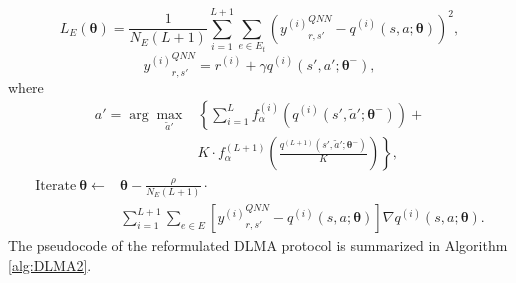 \documentclass[journal,comsoc]{IEEEtran}
\begin{document}
	\begin{equation}\label{loss3}
	{L_E}\left( {{\bm{\theta }}} \right) = \frac{1}{{{N_E}\left( {L + 1} \right)}}\sum\limits_{i = 1}^{L + 1} {\sum\limits_{e \in {E_t}} {{{\left( {{y^{\left( i \right)}}_{r,s'}^{QNN} - {q^{\left( i \right)}}\left( {s,a;{\bm{\theta }}} \right)} \right)}^2}} },
	\end{equation}
	\begin{equation}\label{yQNN3}
	{y^{\left( i \right)}}_{r,s'}^{QNN} = {r^{\left( i \right)}} + \gamma {q^{\left( i \right)}}\left( {s',a';{\bm{\theta^- }}} \right),
	\end{equation}
	where
	\begin{align}\label{greedy_action3}
	a' = \arg {\max _{\tilde a'}} &\left\{ \sum \limits_{i = 1}^L {f_\alpha ^{\left( i \right)}\left( {{q^{\left( i \right)}}\left( {s',\tilde a';{{\bm{\theta^- }}}} \right)} \right)}  + \right. \nonumber \\
	& \left. K \cdot f_\alpha ^{\left( {L + 1} \right)}\left( {\frac{{{q^{\left( {L + 1} \right)}}\left( {s',\tilde a';{{\bm{\theta^- }}}} \right)}}{K}} \right) \right\},
	\end{align}
	\begin{align}\label{theta_update3}
	\text{Iterate} \ \bm{\theta} \leftarrow &{\bm{\theta}} - \frac{\rho}{N_E\left( L + 1\right)} \cdot \nonumber \\ &\sum\limits_{i = 1}^{L + 1} {\sum\limits_{e \in {E}} {\left[ {{y^{\left( i \right)}}_{r,s'}^{QNN} - {q^{\left( i \right)}}\left( {s,a;{\bm{\theta}}} \right)} \right]\nabla {q^{\left( i \right)}}\left( {s,a;{\bm{\theta}}} \right)} }.
	\end{align}
The pseudocode of the reformulated DLMA protocol is summarized in Algorithm \ref{alg:DLMA2}.
\end{document}
